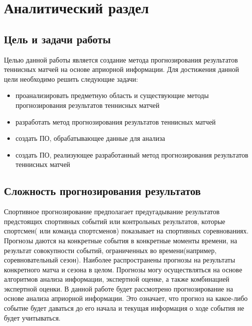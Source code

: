 \chapter{Аналитический раздел}
\label{cha:analysis}
\section{Цель и задачи работы}
Целью данной работы является создание метода прогнозирования результатов теннисных матчей на основе априорной информации.
Для достижения данной цели необходимо решить следующие задачи:
\begin{itemize}
	
\item проанализировать предметную область и существующие методы прогнозирования результатов теннисных матчей
	\item разработать метод прогнозирования результатов теннисных матчей
	\item создать ПО, обрабатывающее данные для анализа
	\item создать ПО, реализующее  разработанный метод прогнозирования результатов теннисных матчей
\end{itemize}
\section{Сложность прогнозирования результатов}
Спортивное прогнозирование предполагает предугадывание результатов предстоящих спортивных событий или контрольных результатов, которые спортсмен( или команда спортсменов) показывает на спортивных соревнованиях\cite{Book01}. Прогнозы даются на конкретные события в конкретные моменты времени, на результат совокупности событий, ограниченных во времени(например, соревновательный сезон). Наиболее распространены прогнозы на результаты конкретного матча и сезона в целом. Прогнозы могу осуществляться на основе алгоритмов анализа информации, экспертной оценке, а также комбинацией экспертной оценки. В данной работе будет рассмотрено прогнозирование на основе анализа априорной информации. Это означает, что прогноз на какое-либо событие будет даваться до его начала и текущая информация о ходе события не будет учитываться.


